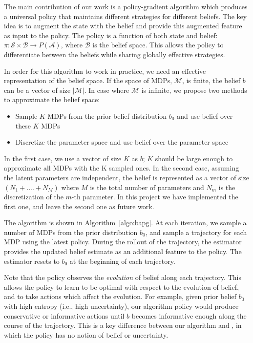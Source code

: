 \documentclass{article}
\newcommand{\aref}[1]{Algorithm~\ref{#1}}%
\begin{document}
The main contribution of our work is a policy-gradient algorithm which produces a universal policy that maintains different strategies for different beliefs. The key idea is to augment the state with the belief and provide this augmented feature as input to the policy. The policy is a function of both state and belief: $\pi: \mathcal{S} \times \mathcal{B} \rightarrow P(\mathcal{A})$, where $\mathcal{B}$ is the belief space. This allows the policy to differentiate between the beliefs while sharing globally effective strategies.

In order for this algorithm to work in practice, we need an effective representation of the belief space. If the space of MDPs, $\mathcal{M}$, is finite, the belief $b$ can be a vector of size $|\mathcal{M}|$. In case where $\mathcal{M}$ is infinite, we propose two methods to approximate the belief space:

\begin{itemize}
    \item Sample $K$ MDPs from the prior belief distribution $b_0$ and use belief over these $K$ MDPs
    \item Discretize the parameter space and use belief over the parameter space
\end{itemize}
In the first case, we use a vector of size $K$ as $b$; $K$ should be large enough to approximate all MDPs with the K sampled ones. In the second case, assuming the latent parameters are independent, the belief is represented as a vector of size $(N_1 + .... + N_M)$ where $M$ is the total number of parameters and $N_m$ is the discretization of the $m$-th parameter. In this project we have implemented the first one, and leave the second one as future work.

The algorithm is shown in \aref{algo:bapg}. At each iteration, we sample a number of MDPs from the prior distribution $b_0$, and sample a trajectory for each MDP using the latest policy. During the rollout of the trajectory, the estimator provides the updated belief estimate as an additional feature to the policy. The estimator resets to $b_0$ at the beginning of each trajectory.

Note that the policy observes the \emph{evolution} of belief along each trajectory. This allows the policy to learn to be optimal with respect to the evolution of belief, and to take actions which affect the evolution. For example, given prior belief $b_0$ with high entropy (i.e., high uncertainty), our algorithm policy would produce conservative or informative actions until $b$ becomes informative enough along the course of the trajectory. This is a key difference between our algorithm and \cite{yu2017uposi}, in which the policy has no notion of belief or uncertainty.
\end{document}
